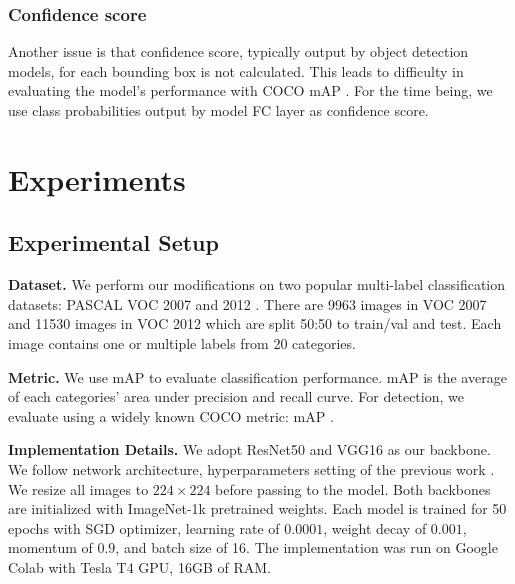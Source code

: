 \documentclass[conference]{IEEEtran}
\begin{document}
\subsubsection{Confidence score}
Another issue is that confidence score, typically output by object detection models, for each bounding box is not calculated. This leads to difficulty in evaluating the model's performance with COCO mAP \cite{lin2015microsoft}. For the time being, we use class probabilities output by model FC layer as confidence score.

\section{Experiments}
\subsection{Experimental Setup}
\textbf{Dataset.} We perform our modifications on two popular multi-label classification datasets: PASCAL VOC 2007 \cite{pascal-voc-2007} and 2012 \cite{pascal-voc-2012}. There are \num{9963} images in VOC 2007 and \num{11530} images in VOC 2012 which are split 50:50 to train/val and test.  Each image contains one or multiple labels from 20 categories.

\textbf{Metric.} We use mAP to evaluate classification performance. mAP is the average of each categories' area under precision and recall curve. For detection, we evaluate using a widely known COCO metric: mAP \cite{lin2015microsoft}.

\textbf{Implementation Details.} We adopt ResNet50 \cite{7780459} and VGG16 \cite{simonyan2015deep} as our backbone. We follow network architecture, hyperparameters setting of the previous work \cite{kim2022bridging}. We resize all images to $224\times224$ before passing to the model. Both backbones are initialized with ImageNet-1k \cite{ILSVRC15} pretrained weights. Each model is trained for 50 epochs with SGD optimizer, learning rate of $0.0001$, weight decay of $0.001$, momentum of $0.9$, and batch size of 16. The implementation was run on Google Colab with Tesla T4 GPU, 16GB of RAM.
\end{document}
